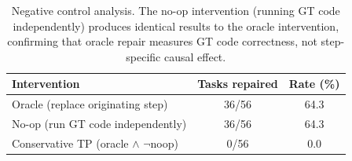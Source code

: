 \begin{table}[t]
\centering
\caption{Negative control analysis. The no-op intervention (running GT code independently) produces identical results to the oracle intervention, confirming that oracle repair measures GT code correctness, not step-specific causal effect.}
\label{tab:negative-control}
\small
\begin{tabular}{@{}lcc@{}}
\toprule
Intervention & Tasks repaired & Rate (\%) \\
\midrule
Oracle (replace originating step) & 36/56 & 64.3 \\
No-op (run GT code independently) & 36/56 & 64.3 \\
\midrule
Conservative TP (oracle $\wedge$ $\neg$noop) & 0/56 & 0.0 \\
\bottomrule
\end{tabular}
\end{table}
